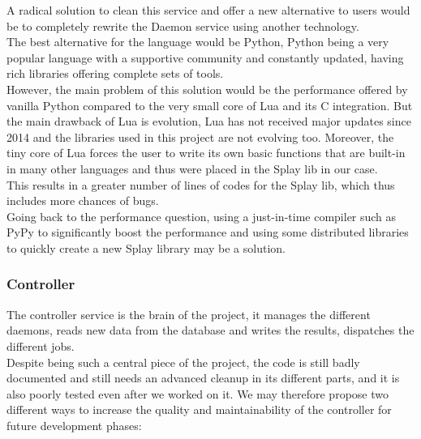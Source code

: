 \documentclass{eplmastersthesis}
\begin{document}
          A radical solution to clean this service and offer a new alternative
          to users would be to completely rewrite the Daemon service using
          another technology.\\
          The best alternative for the language would be Python, Python being a
          very popular language with a supportive community and constantly
          updated, having rich libraries offering complete sets of tools.\\
          However, the main problem of this solution would be the performance
          offered by vanilla Python compared to the very small core of Lua and
          its C integration. But the main drawback of Lua is evolution, Lua has
          not received major updates since 2014 and the libraries used in this
          project are not evolving too. Moreover, the tiny core of Lua forces
          the user to write its own basic functions that are built-in in many
          other languages and thus were placed in the Splay lib in our case.\\
          This results in a greater number of lines of codes for the Splay lib,
          which thus includes more chances of bugs.\\
          Going back to the performance question, using a just-in-time compiler
          such as PyPy \cite{PyPy} to significantly boost the performance and
          using some distributed libraries to quickly create a new Splay library
          may be a solution.

        \subsubsection{Controller}

          The controller service is the brain of the project, it manages the
          different daemons, reads new data from the database and writes the
          results, dispatches the different jobs.\\
          Despite being such a central piece of the project, the code is still
          badly documented and still needs an advanced cleanup in its
          different parts, and it is also poorly tested even after we worked
          on it. We may therefore propose two different ways to increase
          the quality and maintainability of the controller for future
          development phases:
\end{document}
